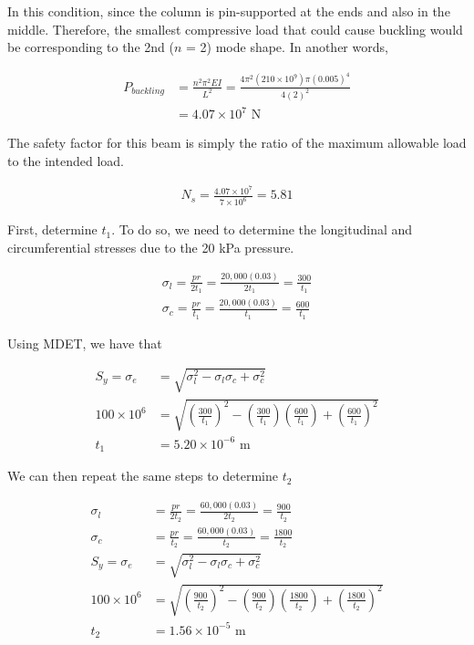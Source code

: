 \documentclass[
10pt,
a4paper,
openany,
svgnames,
]{book}
\begin{document}
\begin{exercises}
\item In this condition, since the column is pin-supported at the ends and
  also in the middle. Therefore, the smallest compressive load that could
  cause buckling would be corresponding to the 2nd ($n$ = 2) mode shape. In
  another words,

  \begin{align*}
    P_{buckling} &= \frac{n^2 \pi^2 EI}{L^2} = \frac{4 \pi^2 (210 \times 10^9) \pi (0.005)^4}{4 (2)^2} \\
                 &= 4.07 \times 10^7 \text{ N}
  \end{align*}

  The safety factor for this beam is simply the ratio of the maximum allowable
  load to the intended load.

  \begin{align*}
    N_s = \frac{4.07 \times 10^7}{7 \times 10^6} = 5.81
  \end{align*}

\item First, determine $t_1$. To do so, we need to determine the
  longitudinal and circumferential stresses due to the 20 kPa pressure.

  \begin{align*}
    \sigma_l = \frac{pr}{2t_1} = \frac{20,000(0.03)}{2t_1} = \frac{300}{t_1} \\
    \sigma_c = \frac{pr}{t_1} = \frac{20,000(0.03)}{t_1} = \frac{600}{t_1}
  \end{align*}

  Using MDET, we have that

  \begin{align*}
    S_y = \sigma_e &= \sqrt{ \sigma_l^2 - \sigma_l\sigma_c + \sigma_c^2 } \\
    100 \times 10^6 &= \sqrt{ \left( \frac{300}{t_1} \right)^2 - \left( \frac{300}{t_1} \right) \left( \frac{600}{t_1} \right) + \left( \frac{600}{t_1} \right)^2 } \\
    t_1 &= 5.20 \times 10^{-6} \text{ m}
  \end{align*}

  We can then repeat the same steps to determine $t_2$

  \begin{align*}
    \sigma_l &= \frac{pr}{2t_2} = \frac{60,000(0.03)}{2t_2} = \frac{900}{t_2} \\
    \sigma_c &= \frac{pr}{t_2} = \frac{60,000(0.03)}{t_2} = \frac{1800}{t_2} \\
    S_y = \sigma_e &= \sqrt{ \sigma_l^2 - \sigma_l\sigma_c + \sigma_c^2 } \\
    100 \times 10^6 &= \sqrt{ \left( \frac{900}{t_2} \right)^2 - \left( \frac{900}{t_2} \right) \left( \frac{1800}{t_2} \right) + \left( \frac{1800}{t_2} \right)^2 } \\
    t_2 &= 1.56 \times 10^{-5} \text{ m}
  \end{align*}
\end{exercises} 
\end{document}
